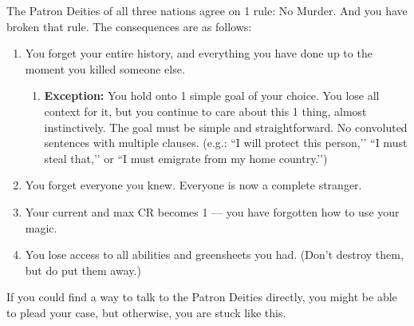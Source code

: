 \documentclass[green]{GL2020}
\begin{document}
\name{\gMurderRegular{}}

The Patron Deities of all three nations agree on 1 rule: No Murder. And you have broken that rule. The consequences are as follows:

\begin{enumerate}
  \item You forget your entire history, and everything you have done up to the moment you killed someone else.
  \begin{enumerate}
    \item \textbf{Exception:} You hold onto 1 simple goal of your choice. You lose all context for it, but you continue to care about this 1 thing, almost instinctively. The goal must be simple and straightforward. No convoluted sentences with multiple clauses. (e.g.: ``I will protect this person,’’ ``I must steal that,’’ or ``I must emigrate from my home country.’’)
  \end{enumerate}
  \item You forget everyone you knew. Everyone is now a complete stranger.
  \item Your current and max CR becomes 1 — you have forgotten how to use your magic.
  \item You lose access to all abilities and greensheets you had. (Don’t destroy them, but do put them away.)
\end{enumerate}

If you could find a way to talk to the Patron Deities directly, you might be able to plead your case, but otherwise, you are stuck like this.
\end{document}
